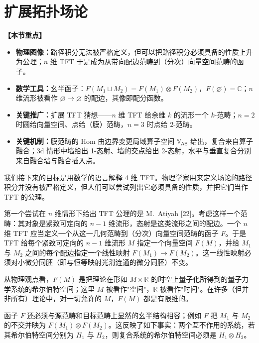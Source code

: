 \documentclass[11pt,a4paper,UTF8]{ctexart}
\newenvironment{keypoints}{%
  \par\addvspace{0.9em}%
  \noindent{\color{black!80}\rule{\linewidth}{0.6pt}}\par\nopagebreak\vspace{2pt}%
  \noindent\textbf{【本节重点】}\par\nopagebreak\vspace{2pt}%
  \begin{itemize}[leftmargin=1.6em,itemsep=1pt,topsep=2pt,parsep=0pt]%
}{%
  \end{itemize}\vspace{1pt}\noindent{\color{black!80}\rule{\linewidth}{0.6pt}}\par\addvspace{0.9em}%
}
\begin{document}
\section{扩展拓扑场论}

\begin{keypoints}
    \item \textbf{物理图像：}路径积分无法被严格定义，但可以把路径积分必须具备的性质上升为公理；$n$ 维 TFT 于是成为从带向配边范畴到（分次）向量空间范畴的函子。
    \item \textbf{数学工具：}幺半函子：$F(M_{1}\sqcup M_{2})=F(M_{1})\otimes F(M_{2})$，$F(\varnothing)=\mathbb{C}$；$n$ 维流形被看作 $\varnothing\to\varnothing$ 的配边，其像即配分函数。
    \item \textbf{关键推广：}扩展 TFT 猜想——$n$ 维 TFT 给余维 $k$ 的流形一个 $k$-范畴；$n=2$ 时圆给向量空间、点给（膜）范畴，$n=3$ 时点给 2-范畴。
    \item \textbf{关键机制：}膜范畴的 Hom 由边界变更局域算子空间 $\mathbb{V}_{\mathsf{A}\mathsf{B}}$ 给出，复合来自算子融合；3d 情形中墙给出 1-态射、墙的交点给出 2-态射，水平与垂直复合分别来自融合墙与融合插入点。
\end{keypoints}

我们接下来的目标是用数学的语言解释 4 维 TFT。物理学家用来定义场论的路径积分并没有被严格定义，但人们可以尝试列出它必须具备的性质，并把它们当作 TFT 的公理。

第一个尝试在 $n$ 维情形下给出 TFT 公理的是 M.~Atiyah [22]。考虑这样一个范畴：其对象是紧致可定向的 $n-1$ 维流形，态射是这类流形之间的配边。一个 $n$ 维 TFT 应当定义一个从这一几何范畴到（分次）向量空间范畴的函子 $F$。于是 TFT 给每个紧致可定向的 $n-1$ 维流形 $M$ 指定一个向量空间 $F(M)$，并给 $M_{1}$ 与 $M_{2}$ 之间的每个配边指定一个线性映射 $F(M_{1})\to F(M_{2})$。这一线性映射必须对小微分同胚（即与恒等映射光滑连通的微分同胚）不变。


从物理观点看，$F(M)$ 是把理论在形如 $M\times\mathbb{R}$ 的时空上量子化所得到的量子力学系统的希尔伯特空间；这里 $M$ 被看作"空间"，$\mathbb{R}$ 被看作"时间"。在许多（但并非所有）理论中，对一切允许的 $M$，$F(M)$ 都是有限维的。

函子 $F$ 还必须与源范畴和目标范畴上显然的幺半结构相容；例如 $F$ 把 $M_{1}$ 与 $M_{2}$ 的不交并映为 $F(M_{1})\otimes F(M_{2})$。这反映了如下事实：两个互不作用的系统，若其希尔伯特空间分别为 $H_{1}$ 与 $H_{2}$，则复合系统的希尔伯特空间必须是 $H_{1}\otimes H_{2}$。
\end{document}
